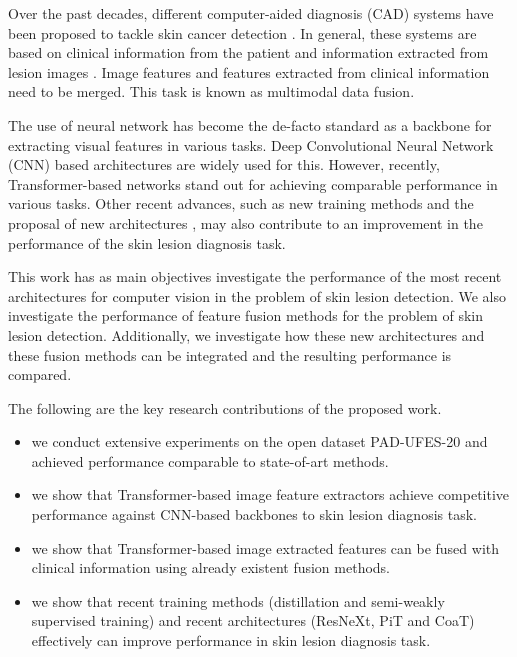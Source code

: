 \documentclass[conference]{IEEEtran}
\begin{document}
Over the past decades, different computer-aided diagnosis (CAD) systems have been proposed to tackle skin cancer detection \cite{takiddin2021artificial, das2021artificial}. In general, these systems are based on clinical information from the patient and information extracted from lesion images \cite{Zhou2021FusionMAT}. Image features and features extracted from clinical information need to be merged. This task is known as multimodal data fusion.

The use of neural network has become the de-facto standard as a backbone for extracting visual features in various tasks. Deep Convolutional Neural Network (CNN) based architectures are widely used for this. However, recently, Transformer-based networks stand out for achieving comparable performance in various tasks. Other recent advances, such as new training methods \cite{sirotkin2021improved} and the proposal of new architectures \cite{karthik2022eff2net}, may also contribute to an improvement in the performance of the skin lesion diagnosis task.

This work has as main objectives investigate the performance of the most recent architectures for computer vision in the problem of skin lesion detection. We also investigate the performance of feature fusion methods for the problem of skin lesion detection. Additionally, we investigate how these new architectures and these fusion methods can be integrated and the resulting performance is compared.

The following are the key research contributions of the proposed work.

\begin{itemize}
\item we conduct extensive experiments on the open dataset PAD-UFES-20\cite{pacheco2020pad} and achieved performance comparable to state-of-art methods.

\item we show that Transformer-based image feature extractors achieve competitive performance against CNN-based backbones to skin lesion diagnosis task.

\item we show that Transformer-based image extracted features can be fused with clinical information using already existent fusion methods.

\item we show that recent training methods (distillation and semi-weakly supervised training) and recent architectures (ResNeXt, PiT and CoaT) effectively can improve performance in skin lesion diagnosis task.
\end{itemize}
\end{document}
